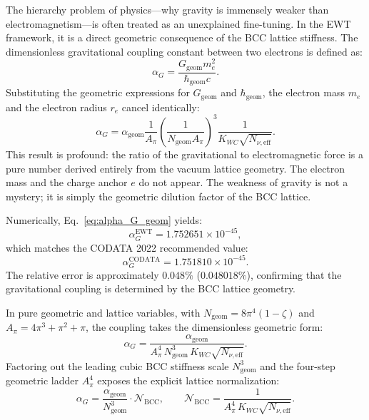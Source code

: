 \documentclass[10pt,a4paper]{article}
\begin{document}
The hierarchy problem of physics---why gravity is immensely weaker than electromagnetism---is often treated as an unexplained fine-tuning. In the EWT framework, it is a direct geometric consequence of the BCC lattice stiffness. The dimensionless gravitational coupling constant between two electrons is defined as:
\begin{equation}
	\alpha_G = \frac{G_{\text{geom}} m_e^2}{\hbar_{\text{geom}} c}.
\end{equation}
Substituting the geometric expressions for \(G_{\text{geom}}\) and \(\hbar_{\text{geom}}\), the electron mass \(m_e\) and the electron radius \(r_e\) cancel identically:
\begin{equation}
	\boxed{
		\alpha_G = \alpha_{\text{geom}} \frac{1}{A_\pi} \left(\frac{1}{N_{\text{geom}} A_\pi}\right)^3 \frac{1}{K_{WC} \sqrt{N_{\nu,\text{eff}}}}.
	}
	\label{eq:alpha_G_geom}
\end{equation}
This result is profound: the ratio of the gravitational to electromagnetic force is a pure number derived entirely from the vacuum lattice geometry. The electron mass and the charge anchor \(e\) do not appear. The weakness of gravity is not a mystery; it is simply the geometric dilution factor of the BCC lattice. 

Numerically, Eq.~\eqref{eq:alpha_G_geom} yields:
\begin{equation}
	\alpha_G^{\text{EWT}} = 1.752651 \times 10^{-45},
\end{equation}
which matches the CODATA 2022 recommended value:
\begin{equation}
	\alpha_G^{\text{CODATA}} = 1.751810 \times 10^{-45}.
\end{equation}
The relative error is approximately \(0.048\%\) (\(0.048018\%\)), confirming that the gravitational coupling is determined by the BCC lattice geometry.

In pure geometric and lattice variables, with \(N_{\text{geom}} = 8\pi^4(1-\zeta)\) and \(A_\pi = 4\pi^3 + \pi^2 + \pi\), the coupling takes the dimensionless geometric form:
\begin{equation}
	\alpha_G
	= \frac{\alpha_{\text{geom}}}
	{A_\pi^4 \, N_{\text{geom}}^3 \, K_{WC} \sqrt{N_{\nu,\text{eff}}}}.
	\label{eq:alpha_G_pure_geom}
\end{equation}
Factoring out the leading cubic BCC stiffness scale \(N_{\text{geom}}^3\) and the four-step geometric ladder \(A_\pi^4\) exposes the explicit lattice normalization:
\begin{equation}
	\alpha_G
	= \frac{\alpha_{\text{geom}}}{N_{\text{geom}}^3}
	\cdot \mathcal{N}_{\text{BCC}},
	\qquad
	\mathcal{N}_{\text{BCC}}
	= \frac{1}{A_\pi^4 \, K_{WC} \sqrt{N_{\nu,\text{eff}}}}.
	\label{eq:alpha_G_bcc_norm}
\end{equation}
\end{document}
